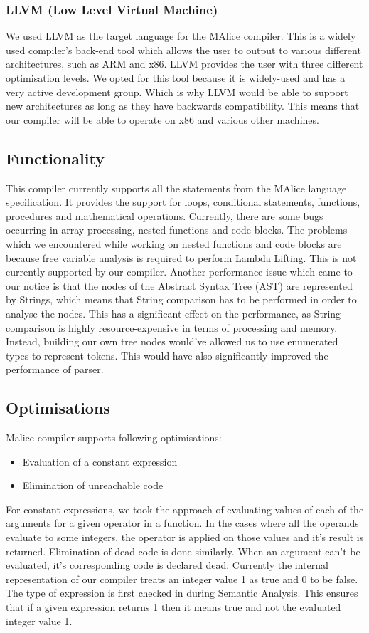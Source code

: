 \documentclass[a4wide, 11pt]{article}
\begin{document}
		\subsubsection{LLVM (Low Level Virtual Machine)}
			We used LLVM as the target language for the MAlice compiler. This is a widely used compiler's back-end tool which
			allows the user to output to various different architectures, such as ARM and x86. LLVM provides the user
			with three different optimisation levels. We opted for this tool because
			it is widely-used and has a very active development group. Which is why LLVM would be able to support new architectures as long as they have backwards compatibility. This means that our compiler will be able to operate on x86 and various other machines.
		
	\subsection{Functionality}			
		This compiler currently supports all the statements from the MAlice language specification. It provides
		the support for loops, conditional statements, functions, procedures and mathematical operations. Currently, there are some bugs
		occurring in array processing, nested functions and code blocks. The problems which we encountered while working on 
		nested functions and code blocks are because free variable analysis is required to perform Lambda Lifting. This is not currently supported by our compiler. Another performance issue which came to our notice is that the nodes of the Abstract Syntax Tree (AST) are represented by Strings, which means that String comparison has to be performed in order to analyse the nodes. This has a significant effect on the performance, as String comparison is highly resource-expensive in terms of processing and memory. Instead, building our own tree nodes would've allowed us to use enumerated types to represent tokens. This would have also significantly improved the performance of parser.
	
	\subsection{Optimisations}
		Malice compiler supports following optimisations:
		\begin{itemize}
			\item Evaluation of a constant expression
			\item Elimination of unreachable code
		\end{itemize} 
		For constant expressions, we took the approach of evaluating values of each of the arguments for a given operator in a function. In the cases where all the operands evaluate to some integers, the operator is applied on those values and it's result is returned. Elimination of dead code is done similarly. When an argument can't be evaluated, it's corresponding code is declared dead. Currently the internal representation of our compiler treats an integer value 1 as true and 0 to be false. The type of expression is first checked in during Semantic Analysis. This ensures that if a given expression returns 1 then it means true and not the evaluated integer value 1.
	
\end{document}
